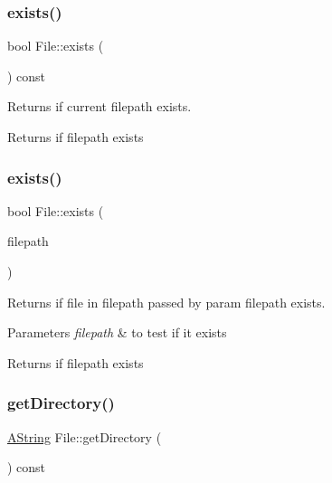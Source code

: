 \subsubsection{\texorpdfstring{exists()}{exists()}\hspace{0.1cm}{\footnotesize\ttfamily [1/2]}}
{\footnotesize\ttfamily bool File\+::exists (\begin{DoxyParamCaption}{ }\end{DoxyParamCaption}) const}



Returns if current filepath exists. 

\begin{DoxyReturn}{Returns}
if filepath exists 
\end{DoxyReturn}
\mbox{\label{class_file_a7b28f74e97c46f0b95ec159c2425dca0}} 
\subsubsection{\texorpdfstring{exists()}{exists()}\hspace{0.1cm}{\footnotesize\ttfamily [2/2]}}
{\footnotesize\ttfamily bool File\+::exists (\begin{DoxyParamCaption}\item[{const \mbox{\hyperlink{class_a_string}{A\+String}} \&}]{filepath }\end{DoxyParamCaption})\hspace{0.3cm}{\ttfamily [static]}}



Returns if file in filepath passed by param filepath exists. 


\begin{DoxyParams}{Parameters}
{\em filepath} & to test if it exists \\
\hline
\end{DoxyParams}
\begin{DoxyReturn}{Returns}
if filepath exists 
\end{DoxyReturn}
\mbox{\label{class_file_ac3770227bca4efa56a4d3a33fe83fa8e}} 
\subsubsection{\texorpdfstring{getDirectory()}{getDirectory()}}
{\footnotesize\ttfamily \mbox{\hyperlink{class_a_string}{A\+String}} File\+::get\+Directory (\begin{DoxyParamCaption}{ }\end{DoxyParamCaption}) const}



